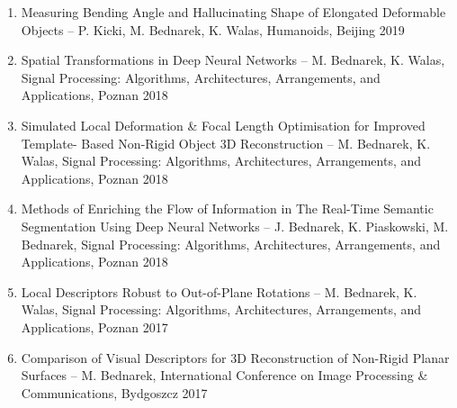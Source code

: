 \documentclass[a4paper, 10pt, twoside]{report}
\begin{document}
\begin{enumerate}
    \item Measuring Bending Angle and Hallucinating Shape of Elongated Deformable Objects – P. Kicki, M. Bednarek, K. Walas, Humanoids, Beijing 2019

    \item Spatial Transformations in Deep Neural Networks – M. Bednarek, K. Walas, Signal Processing: Algorithms, Architectures, Arrangements, and Applications, Poznan 2018

    \item Simulated Local Deformation \& Focal Length Optimisation for Improved Template- Based Non-Rigid Object 3D Reconstruction – M. Bednarek, K. Walas, Signal Processing: Algorithms, Architectures, Arrangements, and Applications, Poznan 2018

    \item Methods of Enriching the Flow of Information in The Real-Time Semantic Segmentation Using Deep Neural Networks – J. Bednarek, K. Piaskowski, M. Bednarek, Signal Processing: Algorithms, Architectures, Arrangements, and Applications, Poznan 2018

    \item Local Descriptors Robust to Out-of-Plane Rotations – M. Bednarek, K. Walas, Signal Processing: Algorithms, Architectures, Arrangements, and Applications, Poznan 2017

    \item Comparison of Visual Descriptors for 3D Reconstruction of Non-Rigid Planar Surfaces – M. Bednarek, International Conference on Image Processing \& Communications, Bydgoszcz 2017
    
\end{enumerate}



\end{document}
